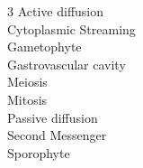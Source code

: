 
\begin{multicols}{3}
Active diffusion \\
Cytoplasmic Streaming \\
Gametophyte \\
Gastrovascular cavity \\
Meiosis \\
Mitosis \\
Passive diffusion \\
Second Messenger \\
Sporophyte \\
\end{multicols}
